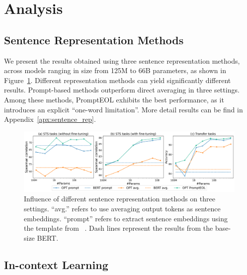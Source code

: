 \documentclass{article}
\begin{document}
\section{Analysis}
\subsection{Sentence Representation Methods}
We present the results obtained using three sentence representation methods, across models ranging in size from 125M to 66B parameters, as shown in Figure~\ref{fig:PromptEOL_rep}. Different representation methods can yield significantly different results.
Prompt-based methods outperform direct averaging in three settings.
Among these methods, PromptEOL exhibits the best performance, as it introduces an explicit ``one-word limitation''.
More detail results can be find in Appendix~\ref{apx:sentence_rep}.

\begin{figure}[h]
\centering
	\includegraphics[width=\columnwidth]{PromptEOL_compare.png}
\caption{
  Influence of different sentence representation methods on three settings.
  ``avg.'' refers to use averaging output tokens as sentence embeddings.
  ``prompt'' refers to extract sentence embeddings using the template from~\cite{jiang2022promptbert} .
  Dash lines represent the results from the base-size BERT.
}
\label{fig:PromptEOL_rep}
\end{figure}

\subsection{In-context Learning}
\end{document}
